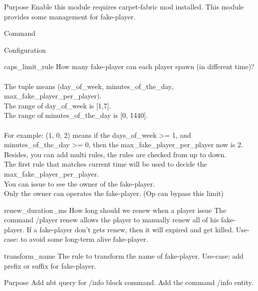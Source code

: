 


Purpose
Enable this module requires carpet-fabric mod installed.
This module provides some management for fake-player.

Command

Configuration
\begin{Configuration}
    \item[caps\_limit\_rule] {
        How many fake-player can each player spawn (in different time)?\\
        \\
        The tuple means (day\_of\_week, minutes\_of\_the\_day, max\_fake\_player\_per\_player).\\
        The range of day\_of\_week is [1,7].\\
        The range of minutes\_of\_the\_day is [0, 1440].\\
        \\
        For example: (1, 0, 2) means if the days\_of\_week >= 1, and minutes\_of\_the\_day >= 0, then the max\_fake\_player\_per\_player now is 2.\\
        Besides, you can add multi rules, the rules are checked from up to down.\\
        The first rule that matches current time will be used to decide the max\_fake\_player\_per\_player.\\
        You can issue  to see the owner of the fake-player.\\
        Only the owner can operates the fake-player. (Op can bypass this limit)
    }

    \item[renew\_duration\_ms] {
        How long should we renew when a player issue 
        The command /player renew allows the player to manually renew all of his fake-player.
        If a fake-player don't gets renew, then it will expired and get killed.
        Use-case: to avoid some long-term alive fake-player.
    }

    \item[transform\_name]{
        The rule to transform the name of fake-player.
        Use-case: add prefix or suffix for fake-player.
    }

\end{Configuration}

\clearpage

Purpose
Add nbt query for /info block command.
Add the command /info entity.



